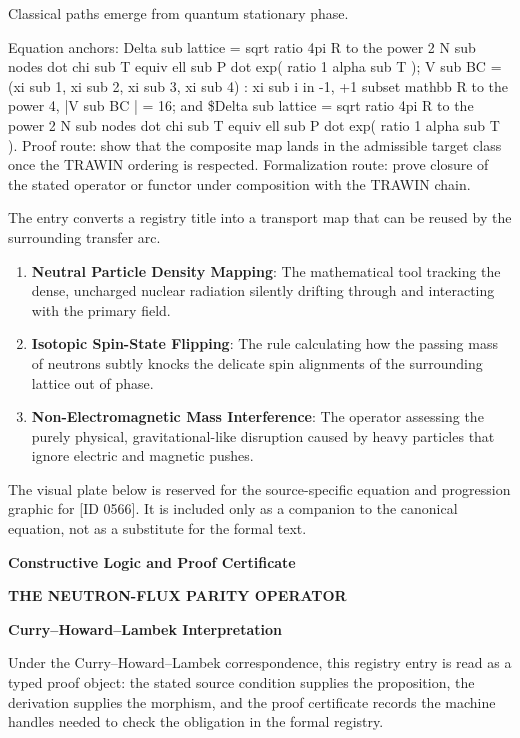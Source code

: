 Classical paths emerge from quantum stationary phase.

Equation anchors: Delta sub lattice = sqrt ratio 4pi R to the power 2 N sub nodes dot chi sub T equiv ell sub P dot exp( ratio 1 alpha sub T ); V sub BC = (xi sub 1, xi sub 2, xi sub 3, xi sub 4) : xi sub i in -1, +1 subset mathbb R to the power 4, |V sub BC | = 16; and \$Delta sub lattice = sqrt ratio 4pi R to the power 2 N sub nodes dot chi sub T equiv ell sub P dot exp( ratio 1 alpha sub T ). Proof route: show that the composite map lands in the admissible target class once the TRAWIN ordering is respected. Formalization route: prove closure of the stated operator or functor under composition with the TRAWIN chain.

The entry converts a registry title into a transport map that can be reused by the surrounding transfer arc.
\endgroup

\begin{enumerate}[leftmargin=1.6em,itemsep=6pt,topsep=4pt]
\item \textbf{Neutral Particle Density Mapping}: The mathematical tool tracking the dense, uncharged nuclear radiation silently drifting through and interacting with the primary field.
\item \textbf{Isotopic Spin-State Flipping}: The rule calculating how the passing mass of neutrons subtly knocks the delicate spin alignments of the surrounding lattice out of phase.
\item \textbf{Non-Electromagnetic Mass Interference}: The operator assessing the purely physical, gravitational-like disruption caused by heavy particles that ignore electric and magnetic pushes.
\end{enumerate}

\begingroup\footnotesize\sloppy
The visual plate below is reserved for the source-specific equation and progression graphic for [ID 0566]. It is included only as a companion to the canonical equation, not as a substitute for the formal text.
\par\endgroup
\ifTZPDarkEdition
{}
\fi

\clearpage
\begingroup\tzpsupportsetup
\noindent\textbf{\fontsize{10.8pt}{12.8pt}\selectfont [ID 0566] Constructive Logic and Proof Certificate}\par
\noindent\textbf{\fontsize{10pt}{12pt}\selectfont THE NEUTRON-FLUX PARITY OPERATOR}\par
\vspace{0.45em}
\begingroup
\footnotesize
\setlength{\parskip}{0.22em}
\setlength{\parindent}{0pt}
\noindent\textbf{Curry--Howard--Lambek Interpretation}\par
Under the Curry--Howard--Lambek correspondence, this registry entry is read as a typed proof
object: the stated source condition supplies the proposition, the derivation supplies the
morphism, and the proof certificate records the machine handles needed to check the obligation
in the formal registry.

